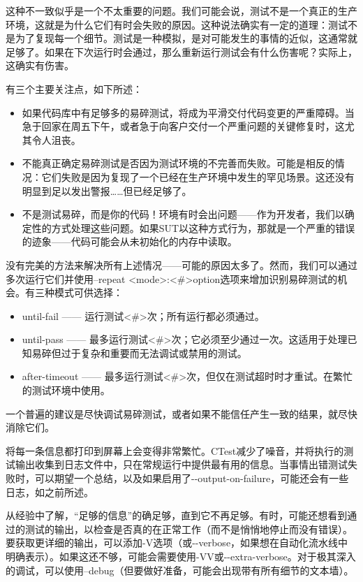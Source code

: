 这种不一致似乎是一个不太重要的问题。我们可能会说，测试不是一个真正的生产环境，这就是为什么它们有时会失败的原因。这种说法确实有一定的道理：测试不是为了复现每一个细节。测试是一种模拟，是对可能发生的事情的近似，这通常就足够了。如果在下次运行时会通过，那么重新运行测试会有什么伤害呢？实际上，这确实有伤害。

有三个主要关注点，如下所述：

\begin{itemize}
\item
如果代码库中有足够多的易碎测试，将成为平滑交付代码变更的严重障碍。当急于回家在周五下午，或者急于向客户交付一个严重问题的关键修复时，这尤其令人沮丧。

\item
不能真正确定易碎测试是否因为测试环境的不完善而失败。可能是相反的情况：它们失败是因为复现了一个已经在生产环境中发生的罕见场景。这还没有明显到足以发出警报……但已经足够了。

\item
不是测试易碎，而是你的代码！环境有时会出问题——作为开发者，我们以确定性的方式处理这些问题。如果SUT以这种方式行为，那就是一个严重的错误的迹象——代码可能会从未初始化的内存中读取。
\end{itemize}

没有完美的方法来解决所有上述情况——可能的原因太多了。然而，我们可以通过多次运行它们并使用–repeat <mode>:<\#>option选项来增加识别易碎测试的机会。有三种模式可供选择：

\begin{itemize}
\item
until-fail —— 运行测试<\#>次；所有运行都必须通过。

\item
until-pass —— 最多运行测试<\#>次；它必须至少通过一次。这适用于处理已知易碎但过于复杂和重要而无法调试或禁用的测试。

\item
after-timeout —— 最多运行测试<\#>次，但仅在测试超时时才重试。在繁忙的测试环境中使用。
\end{itemize}

一个普遍的建议是尽快调试易碎测试，或者如果不能信任产生一致的结果，就尽快消除它们。


将每一条信息都打印到屏幕上会变得非常繁忙。CTest减少了噪音，并将执行的测试输出收集到日志文件中，只在常规运行中提供最有用的信息。当事情出错测试失败时，可以期望一个总结，以及如果启用了-{}-output-on-failure，可能还会有一些日志，如之前所述。

从经验中了解，“足够的信息”的确足够，直到它不再足够。有时，可能还想看到通过的测试的输出，以检查是否真的在正常工作（而不是悄悄地停止而没有错误）。要获取更详细的输出，可以添加-V选项（或-{}-verbose，如果想在自动化流水线中明确表示）。如果这还不够，可能会需要使用-VV或-{}-extra-verbose。对于极其深入的调试，可以使用–debug（但要做好准备，可能会出现带有所有细节的文本墙）。


